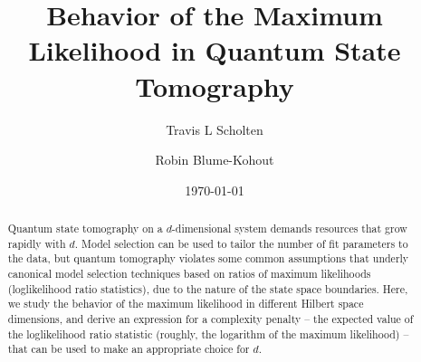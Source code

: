 \documentclass[aps,pra, twocolumn]{revtex4-1}
\begin{document}
\author{Travis L Scholten}
\author{Robin Blume-Kohout}

\title{Behavior of the Maximum Likelihood in Quantum State Tomography}

\begin{abstract}
Quantum state tomography on a $d$-dimensional system demands resources that grow rapidly with $d$. Model selection can be used to tailor the number of fit parameters to the data, but quantum tomography violates some common assumptions that underly canonical model selection techniques based on ratios of maximum likelihoods (loglikelihood ratio statistics), due to the nature of the state space boundaries. Here, we study the behavior of the maximum likelihood  in different Hilbert space dimensions, and derive an expression for a complexity penalty -- the expected value of the loglikelihood ratio statistic (roughly, the logarithm of the maximum likelihood) -- that can be used to make an appropriate choice for $d$.
\end{abstract}
\date{\today}

\maketitle
\end{document}
